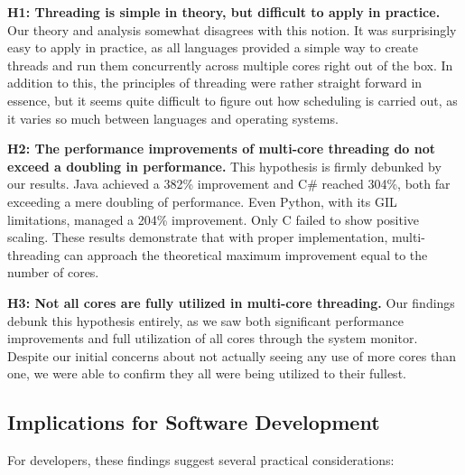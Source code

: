 \documentclass[12pt,a4paper]{article}
\begin{document}
\textbf{H1: Threading is simple in theory, but difficult to apply in practice.}
Our theory and analysis somewhat disagrees with this notion. It was surprisingly easy to apply in practice, as all languages provided a simple way to create threads and run them concurrently across multiple cores right out of the box. In addition to this, the principles of threading were rather straight forward in essence, but it seems quite difficult to figure out how scheduling is carried out, as it varies so much between languages and operating systems. 

\textbf{H2: The performance improvements of multi-core threading do not exceed a doubling in performance.}
This hypothesis is firmly debunked by our results. Java achieved a 382\% improvement and C\# reached 304\%, both far exceeding a mere doubling of performance. Even Python, with its GIL limitations, managed a 204\% improvement. Only C failed to show positive scaling. These results demonstrate that with proper implementation, multi-threading can approach the theoretical maximum improvement equal to the number of cores.

\textbf{H3: Not all cores are fully utilized in multi-core threading.}
Our findings debunk this hypothesis entirely, as we saw both significant performance improvements and full utilization of all cores through the system monitor. Despite our initial concerns about not actually seeing any use of more cores than one, we were able to confirm they all were being utilized to their fullest.

\subsection{Implications for Software Development}

For developers, these findings suggest several practical considerations:
\end{document}
